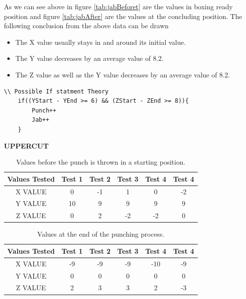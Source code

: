 \documentclass[a4paper,12pt]{report}
\begin{document}
As we can see above in figure \ref{tab:jabBeforet} are the values in boxing ready position and  figure \ref{tab:jabAfter} are the values at the concluding position.
The following conclusion from the above data can be drawn 
\begin{itemize}
    \item The X value usually stays in and around its initial value.
    \item The Y value decreases by an average value of 8.2.
    \item The Z value as well as the Y value decreases by an average value of 8.2.
\end{itemize}
\newpage
\begin{verbatim}
\\ Possible If statment Theory
    if((YStart - YEnd >= 6) && (ZStart - ZEnd >= 8)){
        Punch++
        Jab++
    }
\end{verbatim}


\begin{center}
    \textbf{UPPERCUT}
\end{center}{}
\begin{table}[h]
    \centering
    \begin{tabular}{||c c c c c c||} 
     \hline
     \textbf{Values Tested} & \textbf{Test 1} & \textbf{Test 2} & \textbf{Test 3} & \textbf{Test 4} & \textbf{Test 4} \\ [0.5ex] 
     \hline\hline
     X VALUE & 0 & -1 & 1 & 0 & -2\\ 
     \hline
     Y VALUE & 10 & 9 & 9 & 9 & 9\\  
     \hline
     Z VALUE & 0 & 2 & -2 & -2 & 0\\
     \hline
    \end{tabular}
    \caption{Values before the punch is thrown in a starting position.}
    \label{tab:uppercutBeforet}
\end{table}

\begin{table}[h]
    \centering
    \begin{tabular}{||c c c c c c||} 
     \hline
     \textbf{Values Tested} & \textbf{Test 1} & \textbf{Test 2} & \textbf{Test 3} & \textbf{Test 4} & \textbf{Test 4} \\ [0.5ex] 
     \hline\hline
     X VALUE & -9 & -9 & -9 & -10 & -9\\ 
     \hline
     Y VALUE & 0 & 0 & 0 & 0 & 0\\  
     \hline
     Z VALUE & 2 & 3 & 3 & 2 & -3\\
     \hline
    \end{tabular}
    \caption{Values at the end of the punching process.}
    \label{tab:uppercutAfter}
\end{table}
\end{document}
